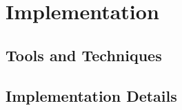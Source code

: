 \chapter{Implementation}
\lipsum[1]
\lipsum[2]
\section{Tools and Techniques}
\lipsum[1]
\lipsum[2]
\section{Implementation Details}
\lipsum[1]
\lipsum[2]
